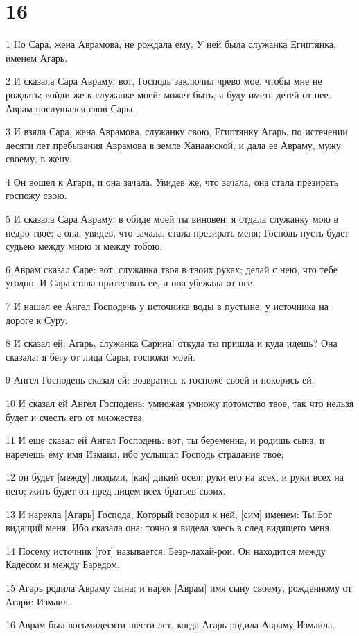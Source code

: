 \chapter{16}

\par 1 Но Сара, жена Аврамова, не рождала ему. У ней была служанка Египтянка, именем Агарь.
\par 2 И сказала Сара Авраму: вот, Господь заключил чрево мое, чтобы мне не рождать; войди же к служанке моей: может быть, я буду иметь детей от нее. Аврам послушался слов Сары.
\par 3 И взяла Сара, жена Аврамова, служанку свою, Египтянку Агарь, по истечении десяти лет пребывания Аврамова в земле Ханаанской, и дала ее Авраму, мужу своему, в жену.
\par 4 Он вошел к Агари, и она зачала. Увидев же, что зачала, она стала презирать госпожу свою.
\par 5 И сказала Сара Авраму: в обиде моей ты виновен; я отдала служанку мою в недро твое; а она, увидев, что зачала, стала презирать меня; Господь пусть будет судьею между мною и между тобою.
\par 6 Аврам сказал Саре: вот, служанка твоя в твоих руках; делай с нею, что тебе угодно. И Сара стала притеснять ее, и она убежала от нее.
\par 7 И нашел ее Ангел Господень у источника воды в пустыне, у источника на дороге к Суру.
\par 8 И сказал ей: Агарь, служанка Сарина! откуда ты пришла и куда идешь? Она сказала: я бегу от лица Сары, госпожи моей.
\par 9 Ангел Господень сказал ей: возвратись к госпоже своей и покорись ей.
\par 10 И сказал ей Ангел Господень: умножая умножу потомство твое, так что нельзя будет и счесть его от множества.
\par 11 И еще сказал ей Ангел Господень: вот, ты беременна, и родишь сына, и наречешь ему имя Измаил, ибо услышал Господь страдание твое;
\par 12 он будет [между] людьми, [как] дикий осел; руки его на всех, и руки всех на него; жить будет он пред лицем всех братьев своих.
\par 13 И нарекла [Агарь] Господа, Который говорил к ней, [сим] именем: Ты Бог видящий меня. Ибо сказала она: точно я видела здесь в след видящего меня.
\par 14 Посему источник [тот] называется: Беэр-лахай-рои. Он находится между Кадесом и между Баредом.
\par 15 Агарь родила Авраму сына; и нарек [Аврам] имя сыну своему, рожденному от Агари: Измаил.
\par 16 Аврам был восьмидесяти шести лет, когда Агарь родила Авраму Измаила.

